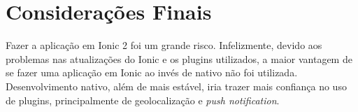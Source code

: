 \section{Considerações Finais}
Fazer a aplicação em Ionic 2 foi um grande risco. Infelizmente, devido aos problemas nas atualizações do Ionic e os plugins utilizados, a maior vantagem de se fazer uma aplicação em Ionic ao invés de nativo não foi utilizada. Desenvolvimento nativo, além de mais estável, iria trazer mais confiança no uso de plugins, principalmente de geolocalização e \textit{push notification}. 
